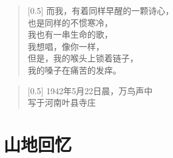 \documentclass[12pt,UTF-8,openany]{ctexbook}
\begin{document}
\begin{large}
    
    \begin{verse}[0.5\linewidth]
        而我，有着同样早醒的一颗诗心， \\
        也是同样的不惯寒冷， \\
        我也有一串生命的歌， \\
        我想唱，像你一样， \\
        但是，我的喉头上锁着链子， \\
        我的嗓子在痛苦的发痒。
    \end{verse}
    
    
    \begin{verse}[0.5\linewidth]
        \hfill 1942年5月22日晨，万鸟声中 \\
        \hfill 写于河南叶县寺庄
    \end{verse}
    
\end{large}



\chapter{山地回忆}
\end{document}
